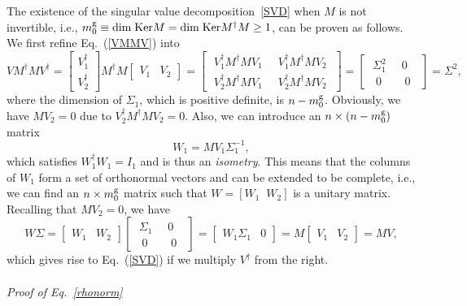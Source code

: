 \documentclass{tADP2e}
\theoremstyle{plain}
\theoremstyle{plain}
\theoremstyle{definition}
\begin{document}
\begin{appendices}
\vspace{3pt}
\noindent
The existence of the singular value decomposition~\eqref{SVD} when $M$ is not invertible, i.e., $m^{\rm g}_0\equiv{\rm dim\;Ker}M={\rm dim\;Ker}M^\dag M\ge1$, can be proven as follows.  We first refine Eq.~(\ref{VMMV}) into  
\begin{equation}
VM^\dag MV^\dag=\begin{bmatrix} V_1^\dag \\ V_2^\dag \end{bmatrix} M^\dag M \begin{bmatrix} V_1 & V_2\end{bmatrix} = \begin{bmatrix} \;V_1^\dag M^\dag M V_1\; & \;V_1^\dag M^\dag M V_2\; \\ \;V_2^\dag M^\dag M V_1\; & \;V_2^\dag M^\dag M V_2\; \end{bmatrix} = \begin{bmatrix} \;\Sigma_1^2\; & \;0\; \\ \;\;0\;\; & \;\;0\;\; \end{bmatrix}=\Sigma^2,
\end{equation}
where the dimension of $\Sigma_1$, which is positive definite, is $n-m^{\rm g}_0$. Obviously, we have $MV_2=0$ due to $V_2^\dag M^\dag M V_2=0$. Also, we can introduce an $n\times(n-m^{\rm g}_0)$ matrix
\begin{equation}
W_1=MV_1\Sigma_1^{-1},
\end{equation}
which satisfies $W_1^\dag W_1=I_1$ and is thus an \emph{isometry}. This means that the columns of $W_1$ form a set of orthonormal vectors and can be extended to be complete, i.e., we can find an $n\times m^{\rm g}_0$ matrix such that $W=[W_1\;\;W_2]$ is a unitary matrix. Recalling that $MV_2=0$, we have
\begin{equation}
W\Sigma=\begin{bmatrix} W_1 & W_2\end{bmatrix} \begin{bmatrix} \;\Sigma_1\; & \;0\; \\ \;\;0\;\; & \;\;0\;\; \end{bmatrix}=\begin{bmatrix} W_1\Sigma_1 & 0\end{bmatrix}=M\begin{bmatrix} V_1 & V_2\end{bmatrix}=MV,
\end{equation}
which gives rise to Eq.~(\ref{SVD}) if we multiply $V^\dag$ from the right. 
\\
\\
{\it Proof of Eq.~\eqref{rhonorm}}


\end{appendices}
\end{document}
